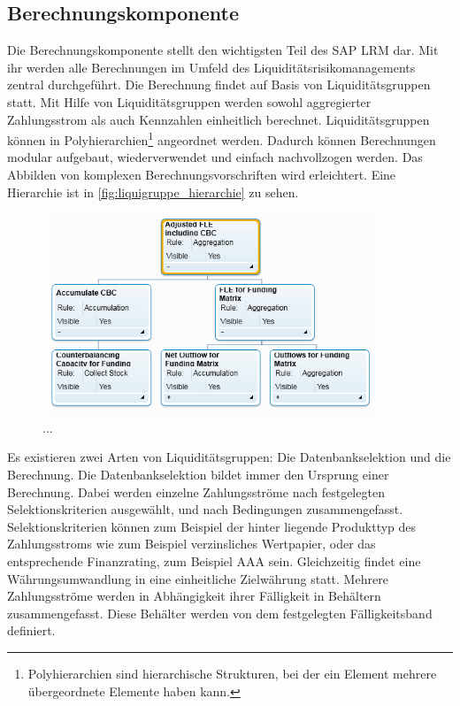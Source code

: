 \begin{onehalfspacing}
\subsection{Berechnungskomponente}
\label{sec:berechnungskomponente}
Die Berechnungskomponente stellt den wichtigsten Teil des SAP LRM dar. Mit ihr werden alle Berechnungen im Umfeld des Liquiditätsrisikomanagements zentral durchgeführt. Die Berechnung findet auf Basis von Liquiditätsgruppen statt. Mit Hilfe von Liquiditätsgruppen werden sowohl aggregierter Zahlungsstrom als auch Kennzahlen einheitlich berechnet. Liquiditätsgruppen können in Polyhierarchien\footnote{Polyhierarchien sind hierarchische Strukturen, bei der ein Element mehrere übergeordnete Elemente haben kann.} angeordnet werden. Dadurch können Berechnungen modular aufgebaut, wiederverwendet und einfach nachvollzogen werden. Das Abbilden von komplexen Berechnungsvorschriften wird erleichtert. Eine Hierarchie ist in \vref{fig:liquigruppe_hierarchie} zu sehen.

\begin{figure}[h]
\centering
\setlength{\unitlength}{1mm}
\includegraphics[width=10cm]{images/liquigruppe_hierarchie.PNG}
\caption{...\label{fig:liquigruppe_hierarchie}}
\end{figure} 

Es existieren zwei Arten von Liquiditätsgruppen: Die Datenbankselektion und die Berechnung. Die Datenbankselektion bildet immer den Ursprung einer Berechnung. Dabei werden einzelne Zahlungsströme nach festgelegten Selektionskriterien ausgewählt, und nach Bedingungen zusammengefasst. Selektionskriterien können zum Beispiel der hinter liegende Produkttyp des Zahlungsstroms wie zum Beispiel verzinsliches Wertpapier, oder das entsprechende Finanzrating, zum Beispiel AAA sein. Gleichzeitig findet eine Währungsumwandlung in eine einheitliche Zielwährung statt. Mehrere Zahlungsströme werden in Abhängigkeit ihrer Fälligkeit in Behältern zusammengefasst. Diese Behälter werden von dem festgelegten Fälligkeitsband definiert.


\end{onehalfspacing}
